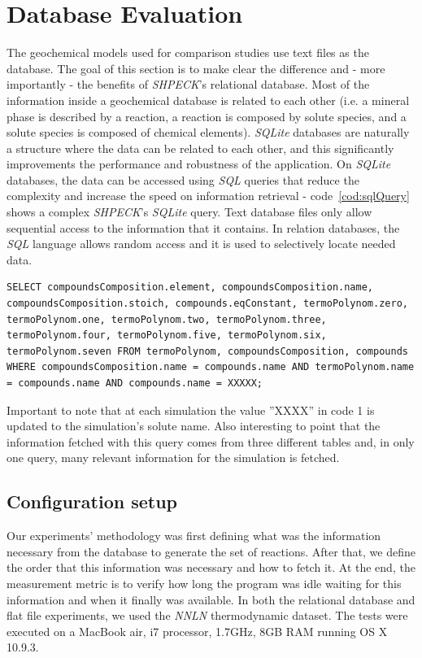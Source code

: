 \section{Database Evaluation}
The geochemical models used for comparison studies use text files as the database. The goal of this section is to make clear the difference and - more importantly - the benefits of \emph{SHPECK}'s relational database. Most of the information inside a geochemical database is related to each other (i.e. a mineral phase is described by a reaction, a reaction is composed by solute species, and a solute species is composed of chemical elements). \emph{SQLite} databases are naturally a structure where the data can be related to each other, and this significantly improvements the performance and robustness of the application. On \emph{SQLite} databases, the data can be accessed using \emph{SQL} queries that reduce the complexity and increase the speed on information retrieval - code~\ref{cod:sqlQuery} shows a complex \emph{SHPECK}'s \emph{SQLite} query. Text database files only allow sequential access to the information that it contains. In relation databases, the \emph{SQL} language allows random access and it  is used to selectively locate needed data.


\begin{minipage}{0.8\linewidth}
\begin{lstlisting}[frame=single, label=cod:sqlQuery, caption=\emph{SHPECK}'s \emph{SQLite} example query]
SELECT compoundsComposition.element, compoundsComposition.name, compoundsComposition.stoich, compounds.eqConstant, termoPolynom.zero, termoPolynom.one, termoPolynom.two, termoPolynom.three, termoPolynom.four, termoPolynom.five, termoPolynom.six, termoPolynom.seven FROM termoPolynom, compoundsComposition, compounds WHERE compoundsComposition.name = compounds.name AND termoPolynom.name = compounds.name AND compounds.name = XXXXX;
\end{lstlisting}
\end{minipage}

Important to note that at each simulation the value ”XXXX” in code 1 is updated to the simulation’s solute name. Also interesting to point that the information fetched with this query comes from three different tables and, in only one query, many relevant information for the simulation is fetched.

\subsection{Configuration setup}
Our experiments' methodology was first defining what was the information necessary from the database to generate the set of reactions. After that, we define the order that this information was necessary and how to fetch it. At the end, the measurement metric is to verify how long the program was idle waiting for this information and when it finally was available. In both the relational database and flat file experiments, we used the \emph{NNLN} thermodynamic dataset.
The tests were executed on a MacBook air, i7 processor, 1.7GHz, 8GB RAM running OS X 10.9.3.


